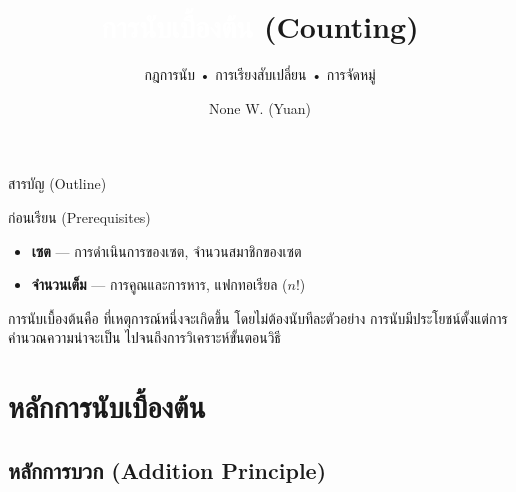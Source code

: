 \documentclass[11pt, aspectratio=169]{beamer}
\title[การนับ]{\textcolor{white}{การนับเบื้องต้น} \textcolor{boxBlue!60}{(Counting)}}
\subtitle{กฎการนับ • การเรียงสับเปลี่ยน • การจัดหมู่ }
\author[None W. (Yuan)]{None W. (Yuan)}
\date{}
\begin{document}
\begin{frame}[plain]
  \titlepage
\end{frame}

\begin{frame}{สารบัญ (Outline)}
  \tableofcontents
\end{frame}

\begin{frame}{ก่อนเรียน (Prerequisites)}
  \begin{explanation}
    \begin{itemize}
      \item \textbf{เซต} — การดำเนินการของเซต, จำนวนสมาชิกของเซต
      \item \textbf{จำนวนเต็ม} — การคูณและการหาร, แฟกทอเรียล ($n!$)
    \end{itemize}
  \end{explanation}

  \begin{intuition}[หัวใจของการนับ]
    การนับเบื้องต้นคือ  ที่เหตุการณ์หนึ่งจะเกิดขึ้น
    โดยไม่ต้องนับทีละตัวอย่าง การนับมีประโยชน์ตั้งแต่การคำนวณความน่าจะเป็น
    ไปจนถึงการวิเคราะห์ขั้นตอนวิธี
  \end{intuition}
\end{frame}

\section{หลักการนับเบื้องต้น}

\subsection{หลักการบวก (Addition Principle)}
\end{document}
